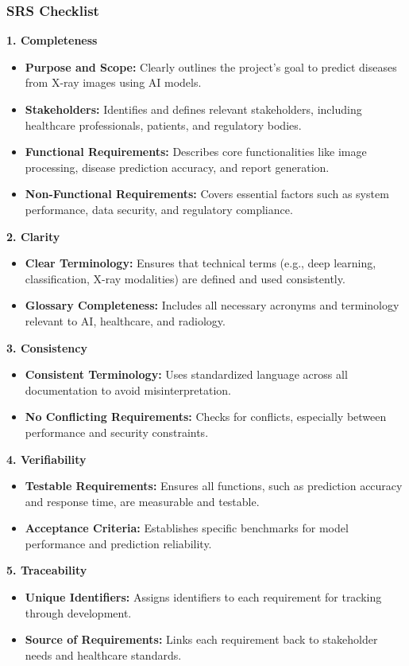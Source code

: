 \documentclass[12pt, titlepage]{article}
\begin{document}
\subsubsection{SRS Checklist}
\textbf{1. Completeness}
\begin{itemize}
    \item \textbf{Purpose and Scope:} Clearly outlines the project’s goal to predict diseases from X-ray images using AI models. 
    \item \textbf{Stakeholders:} Identifies and defines relevant stakeholders, including healthcare professionals, patients, and regulatory bodies. 
    \item \textbf{Functional Requirements:} Describes core functionalities like image processing, disease prediction accuracy, and report generation. 
    \item \textbf{Non-Functional Requirements:} Covers essential factors such as system performance, data security, and regulatory compliance. 
\end{itemize}
\textbf{2. Clarity} 
\begin{itemize}
    \item \textbf{Clear Terminology:} Ensures that technical terms (e.g., deep learning, classification, X-ray modalities) are defined and used consistently. 
    \item \textbf{Glossary Completeness:} Includes all necessary acronyms and terminology relevant to AI, healthcare, and radiology. 
\end{itemize}
\textbf{3. Consistency} 
\begin{itemize}
    \item \textbf{Consistent Terminology:} Uses standardized language across all documentation to avoid misinterpretation. 
    \item \textbf{No Conflicting Requirements:} Checks for conflicts, especially between performance and security constraints. 
\end{itemize}
\textbf{4. Verifiability} 
\begin{itemize}
    \item \textbf{Testable Requirements:} Ensures all functions, such as prediction accuracy and response time, are measurable and testable. 
    \item \textbf{Acceptance Criteria:} Establishes specific benchmarks for model performance and prediction reliability. 
\end{itemize}
\textbf{5. Traceability} 
\begin{itemize}
    \item \textbf{Unique Identifiers:} Assigns identifiers to each requirement for tracking through development. 
    \item \textbf{Source of Requirements:} Links each requirement back to stakeholder needs and healthcare standards. 
\end{itemize}
\end{document}
